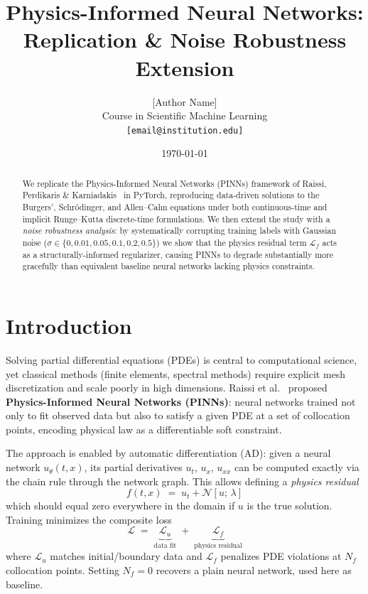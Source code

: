 \documentclass[10pt,twocolumn]{article}
\title{%
  \vspace{-1.2cm}
  {\large\textbf{Physics-Informed Neural Networks:}}\\[2pt]
  {\normalsize Replication \& Noise Robustness Extension}
}
\author{%
  [Author Name]\\
  \small Course in Scientific Machine Learning\\
  \small\texttt{[email@institution.edu]}
}
\date{\small\today}
\begin{document}
\maketitle
\thispagestyle{empty}

\begin{abstract}
\noindent
We replicate the Physics-Informed Neural Networks (PINNs) framework of
Raissi, Perdikaris \& Karniadakis~\cite{raissi2017} in PyTorch,
reproducing data-driven solutions to the Burgers', Schr\"{o}dinger,
and Allen--Cahn equations under both continuous-time and
implicit Runge--Kutta discrete-time formulations.
We then extend the study with a \emph{noise robustness analysis}:
by systematically corrupting training labels with Gaussian noise
($\sigma \in \{0, 0.01, 0.05, 0.1, 0.2, 0.5\}$) we show that the
physics residual term $\mathcal{L}_f$ acts as a structurally-informed
regularizer, causing PINNs to degrade substantially more gracefully
than equivalent baseline neural networks lacking physics constraints.
\end{abstract}

\section{Introduction}

Solving partial differential equations (PDEs) is central to computational
science, yet classical methods (finite elements, spectral methods) require
explicit mesh discretization and scale poorly in high dimensions.
Raissi et al.~\cite{raissi2017} proposed \textbf{Physics-Informed Neural
Networks (PINNs)}: neural networks trained not only to fit observed data
but also to satisfy a given PDE at a set of collocation points, encoding
physical law as a differentiable soft constraint.

The approach is enabled by automatic differentiation (AD): given a neural
network $u_\theta(t,x)$, its partial derivatives $u_t$, $u_x$, $u_{xx}$
can be computed exactly via the chain rule through the network graph.
This allows defining a \emph{physics residual}
\begin{equation}
  f(t,x) \;=\; u_t + \mathcal{N}[u;\,\lambda]
\end{equation}
which should equal zero everywhere in the domain if $u$ is the true
solution.  Training minimizes the composite loss
\begin{equation}
  \mathcal{L} \;=\; \underbrace{\mathcal{L}_u}_{\text{data fit}}
               \;+\; \underbrace{\mathcal{L}_f}_{\text{physics residual}}
  \label{eq:loss}
\end{equation}
where $\mathcal{L}_u$ matches initial/boundary data and
$\mathcal{L}_f$ penalizes PDE violations at $N_f$ collocation points.
Setting $N_f = 0$ recovers a plain neural network, used here as baseline.
\end{document}
